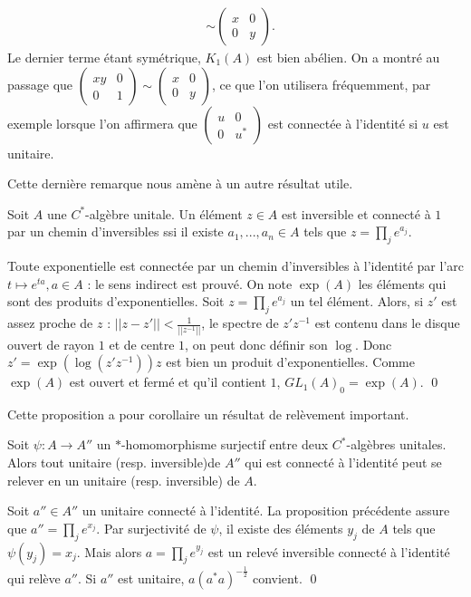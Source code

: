 \begin{enumerate}
\begin{align*}
							&\sim \begin{pmatrix}x & 0\\ 0 & y\end{pmatrix}.
\end{align*}
Le dernier terme étant symétrique, $K_1(A)$ est bien abélien. On a montré au passage que $\begin{pmatrix} xy & 0\\ 0 & 1\end{pmatrix}\sim \begin{pmatrix}x & 0\\ 0 & y\end{pmatrix}$, ce que l'on utilisera fréquemment, par exemple lorsque l'on affirmera que $\begin{pmatrix}u & 0\\ 0 & u^*\end{pmatrix}$ est connectée à l'identité si $u$ est unitaire.
\end{enumerate}

Cette dernière remarque nous amène à un autre résultat utile.
\begin{prop} Soit $A$ une $C^*$-algèbre unitale. Un élément $z\in A$ est inversible et connecté à $1$ par un chemin d'inversibles ssi il existe $a_1,..., a_n\in A$ tels que $z=\prod_j e^{a_j}$.
\end{prop}
\begin{dem}
Toute exponentielle est connectée par un chemin d'inversibles à l'identité par l'arc $t\mapsto e^{t a}, a\in A$ : le sens indirect est prouvé. On note $\exp(A)$ les éléments qui sont des produits d'exponentielles. Soit $z=\prod_j e^{a_j}$ un tel élément. Alors, si $z'$ est assez proche de $z$ : $||z-z'||<\frac{1}{||z^{-1}||}$, le spectre de $z'z^{-1}$ est contenu dans le disque ouvert de rayon $1$ et de centre $1$, on peut donc définir son $\log$. Donc $z'= \exp(\log (z'z^{-1} ) ) z $ est bien un produit d'exponentielles. Comme $\exp(A)$ est ouvert et fermé et qu'il contient $1$, $GL_1(A)_0=\exp(A)$.
\qed
\end{dem}

Cette proposition a pour corollaire un résultat de relèvement important.
\begin{prop}
Soit $\psi : A \rightarrow A''$ un $*$-homomorphisme surjectif entre deux $C^*$-algèbres unitales. Alors tout unitaire (resp. inversible)de $A''$ qui est connecté à l'identité peut se relever en un unitaire (resp. inversible) de $A$. 
\end{prop} 

\begin{dem}Soit $a''\in A''$ un unitaire connecté à l'identité.
La proposition précédente assure que $a'' = \prod_j e^{x_j}$. Par surjectivité de $\psi$, il existe des éléments $y_j$ de $A$ tels que $\psi(y_j)=x_j$. Mais alors $a=\prod_j e^{y_j}$ est un relevé inversible connecté à l'identité qui relève $a''$. Si $a''$ est unitaire, $a(a^*a)^{-\frac{1}{2}}$ convient.
\qed
\end{dem}

